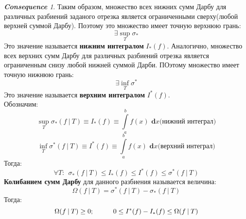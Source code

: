\documentclass[a4paper,12pt]{bookest}
\theoremstyle{remark}
\newtheorem*{cons*}{\textbf{Consequence}}
\newcommand\tab[1][1cm]{\hspace*{#1}}
\newcommand\dx{\textbf{ d}x}
\begin{document}
\begin{cons*}
	Таким образом, множество всех нижних сумм Дарбу для различных разбиений заданого отрезка является ограниченными сверху(любой верхней суммой Дарбу). Поэтому это множество имеет точную верхнюю грань:
	$$\exists\sup_T\sigma_*$$ Это значение называется \textbf{нижним интегралом }$I_*(f)$. Аналогично, множество всех верхних сумм Дарбу для различных разбиений отрезка является ограниченным снизу любой нижней суммой Дарби. ПОэтому множество имеет точную нижнюю грань: 
	$$\exists\inf_T\sigma^*$$ Это значение называется \textbf{верхним интегралом }$I^*(f)$. \\ Обозначим: 
	$$\sup_T\sigma_*(f\>|\>T)\equiv I_*(f)\equiv\int\limits_a^bf(x)\dx\textrm{(нижний интеграл)}$$ 
	$$\inf_T\sigma^*(f\>|\>T)\equiv I^*(f)\equiv\int\limits_a^bf(x)\dx\textrm{(верхний интеграл)}$$ 
	Тогда: $$\forall T:\>\>\sigma_*(f\>|\>T)\leq I_*(f)\leq I^*(f)\leq \sigma^*(f\>|\>T)$$
	\textbf{Колибанием сумм Дарбу} для данного разбиения называется величина: $$\Omega(f\>|\>T)=\sigma^*(f\>|\>T)-\sigma_*(f\>|\>T)$$
	Тогда: $$\Omega(f\>|\>T)\geq0;\tab0\leq I^*(f)-I_*(f)\leq\Omega(f\>|\>T)$$
\end{cons*} 
\end{document}
